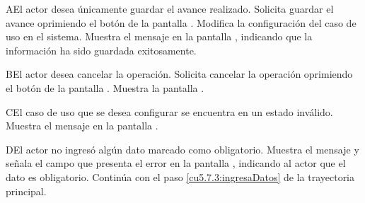  \begin{UCtrayectoriaA}{A}{El actor desea únicamente guardar el avance realizado.}
     \UCpaso[\UCactor] Solicita guardar el avance oprimiendo el botón  de la pantalla .
    \UCpaso[\UCsist] Modifica la configuración del caso de uso en el sistema.   
    \UCpaso[\UCsist] Muestra el mensaje  en la pantalla , indicando que la información ha sido guardada exitosamente.
 \end{UCtrayectoriaA}
 

 \begin{UCtrayectoriaA}{B}{El actor desea cancelar la operación.}
    \UCpaso[\UCactor] Solicita cancelar la operación oprimiendo el botón  de la pantalla .
    \UCpaso[\UCsist] Muestra la pantalla .
 \end{UCtrayectoriaA}
 
 \begin{UCtrayectoriaA}{C}{El caso de uso que se desea configurar se encuentra en un estado inválido.}
    \UCpaso[\UCsist] Muestra el mensaje  en la pantalla .
 \end{UCtrayectoriaA}

 \begin{UCtrayectoriaA}{D}{El actor no ingresó algún dato marcado como obligatorio.}
    \UCpaso[\UCsist] Muestra el mensaje  y señala el campo que presenta el error en la pantalla 
        , indicando al actor que el dato es obligatorio.
    \UCpaso[] Continúa con el paso \ref{cu5.7.3:ingresaDatos} de la trayectoria principal.
 \end{UCtrayectoriaA}

